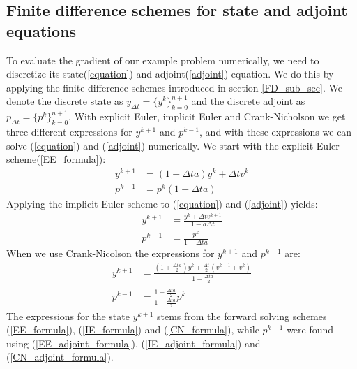 \subsection{Finite difference schemes for state and adjoint equations}
To evaluate the gradient of our example problem numerically, we need to discretize its state(\ref{equation}) and adjoint(\ref{adjoint}) equation. We do this by applying the finite difference schemes introduced in section \ref{FD_sub_sec}. We denote the discrete state as $y_{\Delta t}=\{y^k\}_{k=0}^{n+1}$ and the discrete adjoint as $p_{\Delta t}=\{p^k\}_{k=0}^{n+1}$. With explicit Euler, implicit Euler and Crank-Nicholson we get three different expressions for $y^{k+1}$ and $p^{k-1}$, and with these expressions we can solve (\ref{equation}) and (\ref{adjoint}) numerically. We start with the explicit Euler scheme(\ref{EE_formula}):
\begin{align}
y^{k+1}&=(1 +\Delta ta) y^{k} + \Delta t v^{k}\label{E_state} \\
p^{k-1} &=p^k(1 +\Delta ta)\label{E_adjoint}
\end{align}
Applying the implicit Euler scheme to (\ref{equation}) and (\ref{adjoint}) yields:
\begin{align}
y^{k+1} &=\frac{y^{k} +\Delta t v^{k+1}}{1-a\Delta t} \label{I_state} \\
p^{k-1} &= \frac{p^k}{1-\Delta ta} \label{I_adjoint}
\end{align}
When we use Crank-Nicolson the expressions for $y^{k+1}$ and $p^{k-1}$ are:
\begin{align}
y^{k+1} &= \frac{(1+\frac{\Delta ta}{2})y^k +\frac{\Delta t}{2}(v^{k+1}+v^{k})}{1-\frac{\Delta t a}{2}}\label{CN_FD_state} \\
p^{k-1} &= \frac{1+\frac{\Delta ta}{2}}{1-\frac{\Delta t a}{2}}p^k\label{CN_FD_adjoint}
\end{align}
The expressions for the state $y^{k+1}$ stems from the forward solving schemes (\ref{EE_formula}), (\ref{IE_formula}) and (\ref{CN_formula}), while $p^{k-1}$ were found using (\ref{EE_adjoint_formula}), (\ref{IE_adjoint_formula}) and (\ref{CN_adjoint_formula}).
